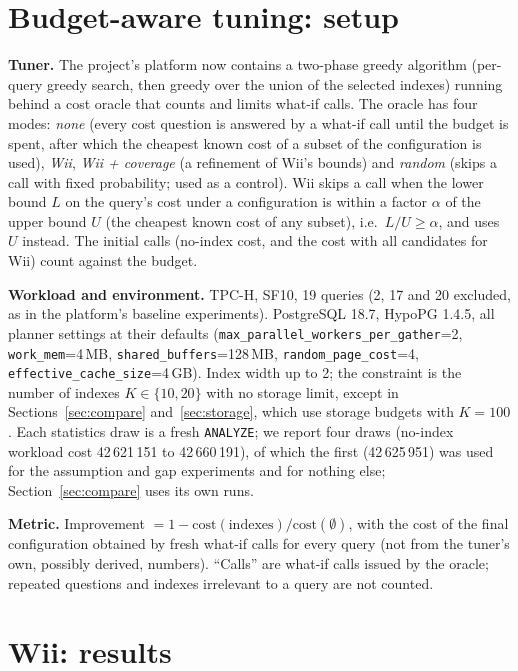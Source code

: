 \section{Budget-aware tuning: setup}\label{sec:setup}
\textbf{Tuner.} The project's platform now contains a two-phase greedy algorithm (per-query greedy search, then greedy over the union of the selected indexes) running behind a cost oracle that counts and limits what-if calls. The oracle has four modes: \emph{none} (every cost question is answered by a what-if call until the budget is spent, after which the cheapest known cost of a subset of the configuration is used), \emph{Wii}, \emph{Wii + coverage} (a refinement of Wii's bounds) and \emph{random} (skips a call with fixed probability; used as a control). Wii skips a call when the lower bound $L$ on the query's cost under a configuration is within a factor $\alpha$ of the upper bound $U$ (the cheapest known cost of any subset), i.e.\ $L/U\ge\alpha$, and uses $U$ instead. The initial calls (no-index cost, and the cost with all candidates for Wii) count against the budget.

\textbf{Workload and environment.} TPC-H, SF10, 19 queries (2, 17 and 20 excluded, as in the platform's baseline experiments). PostgreSQL 18.7, HypoPG 1.4.5, all planner settings at their defaults (\texttt{max\_parallel\_workers\_per\_gather}=2, \texttt{work\_mem}=4\,MB, \texttt{shared\_buffers}=128\,MB, \texttt{random\_page\_cost}=4, \texttt{effective\_cache\_size}=4\,GB). Index width up to 2; the constraint is the number of indexes $K\in\{10,20\}$ with no storage limit, except in Sections~\ref{sec:compare} and~\ref{sec:storage}, which use storage budgets with $K=100$. Each statistics draw is a fresh \texttt{ANALYZE}; we report four draws (no-index workload cost 42\,621\,151 to 42\,660\,191), of which the first (42\,625\,951) was used for the assumption and gap experiments and for nothing else; Section~\ref{sec:compare} uses its own runs.

\textbf{Metric.} Improvement $=1-\text{cost}(\text{indexes})/\text{cost}(\emptyset)$, with the cost of the final configuration obtained by fresh what-if calls for every query (not from the tuner's own, possibly derived, numbers). ``Calls'' are what-if calls issued by the oracle; repeated questions and indexes irrelevant to a query are not counted.

\section{Wii: results}
